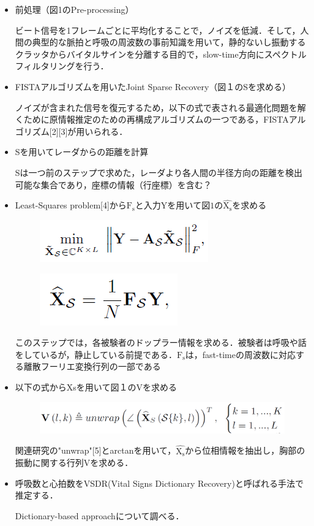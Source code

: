 \documentclass[dvipdfmx]{jsarticle}
\begin{document}
\begin{itemize}
    \item 前処理（図1のPre-processing）

ビート信号を1フレームごとに平均化することで，ノイズを低減．そして，人間の典型的な脈拍と呼吸の周波数の事前知識を用いて，静的ないし振動するクラッタからバイタルサインを分離する目的で，slow-time方向にスペクトルフィルタリングを行う．

    \item FISTAアルゴリズムを用いたJoint Sparse Recovery（図１のSを求める）

ノイズが含まれた信号を復元するため，以下の式で表される最適化問題を解くために原情報推定のための再構成アルゴリズムの一つである，FISTAアルゴリズム[2][3]が用いられる．
    \item Sを用いてレーダからの距離を計算

Sは一つ前のステップで求めた，レーダより各人間の半径方向の距離を検出可能な集合であり，座標の情報（行座標）を含む？
    \item Least-Squares problem[4]から$\mathrm{F_s}と入力\mathrm{Y}を用いて図1の\mathrm{\hat{X_s}}$を求める
\begin{figure}[H]
\begin{center}
\includegraphics[width=0.35\linewidth]{./img/equation3.png}
\end{center}
\end{figure}
\begin{figure}[htbp]
\begin{center}
\includegraphics[width=0.2\linewidth]{./img/equation4.png}
\end{center}
\end{figure}

このステップでは，各被験者のドップラー情報を求める．被験者は呼吸や話をしているが，静止している前提である．$\mathrm{F_s}$は，fast-timeの周波数に対応する離散フーリエ変換行列の一部である
    \item 以下の式からXsを用いて図１のVを求める
\begin{figure}[htbp]
\begin{center}
\includegraphics[width=0.6\linewidth]{./img/equation2.png}

\end{center}
\end{figure}
関連研究の"unwrap"[5]とarctanを用いて，$\hat{\mathrm{X_s}}$から位相情報を抽出し，胸部の振動に関する行列Vを求める．
    \item 呼吸数と心拍数をVSDR(Vital Signs Dictionary Recovery)と呼ばれる手法で推定する．

Dictionary-based approachについて調べる．
\end{itemize}
\end{document}
